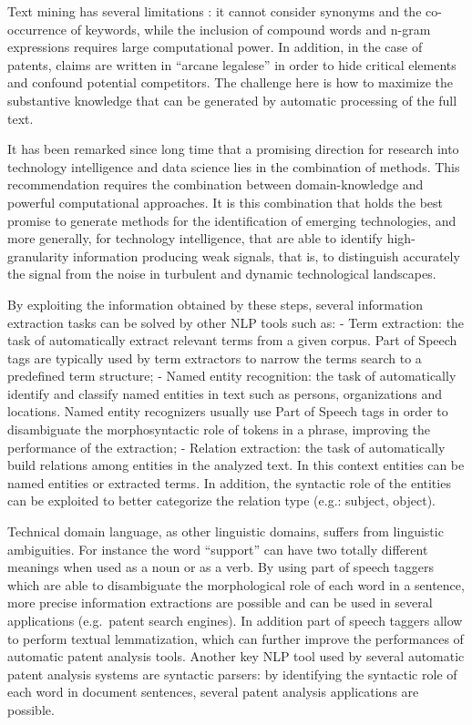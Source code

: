 \documentclass[]{book}
\begin{document}
Text mining has several limitations : it cannot consider synonyms and
the co-occurrence of keywords, while the inclusion of compound words and
n-gram expressions requires large computational power. In addition, in
the case of patents, claims are written in ``arcane legalese'' in order
to hide critical elements and confound potential competitors. The
challenge here is how to maximize the substantive knowledge that can be
generated by automatic processing of the full text.

It has been remarked since long time that a promising direction for
research into technology intelligence and data science lies in the
combination of methods. This recommendation requires the combination
between domain-knowledge and powerful computational approaches. It is
this combination that holds the best promise to generate methods for the
identification of emerging technologies, and more generally, for
technology intelligence, that are able to identify high-granularity
information producing weak signals, that is, to distinguish accurately
the signal from the noise in turbulent and dynamic technological
landscapes.

By exploiting the information obtained by these steps, several
information extraction tasks can be solved by other NLP tools such as: -
Term extraction: the task of automatically extract relevant terms from a
given corpus. Part of Speech tags are typically used by term extractors
to narrow the terms search to a predefined term structure; - Named
entity recognition: the task of automatically identify and classify
named entities in text such as persons, organizations and locations.
Named entity recognizers usually use Part of Speech tags in order to
disambiguate the morphosyntactic role of tokens in a phrase, improving
the performance of the extraction; - Relation extraction: the task of
automatically build relations among entities in the analyzed text. In
this context entities can be named entities or extracted terms. In
addition, the syntactic role of the entities can be exploited to better
categorize the relation type (e.g.: subject, object).

Technical domain language, as other linguistic domains, suffers from
linguistic ambiguities. For instance the word ``support'' can have two
totally different meanings when used as a noun or as a verb. By using
part of speech taggers which are able to disambiguate the morphological
role of each word in a sentence, more precise information extractions
are possible and can be used in several applications (e.g.~patent search
engines). In addition part of speech taggers allow to perform textual
lemmatization, which can further improve the performances of automatic
patent analysis tools. Another key NLP tool used by several automatic
patent analysis systems are syntactic parsers: by identifying the
syntactic role of each word in document sentences, several patent
analysis applications are possible.
\end{document}
